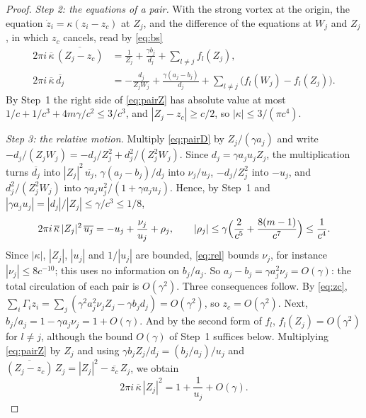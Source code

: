 \documentclass[11pt]{article}
\theoremstyle{definition}
\begin{document}
\begin{proof}
\emph{Step 2: the equations of a pair.} With the strong vortex at the origin, the equation $\dot z_i = \kappa(z_i - z_c)$ at $Z_j$, and the difference of the equations at $W_j$ and $Z_j$, in which $z_c$ cancels, read by \eqref{eq:bs}
\begin{align}
  2\pi i\,\overline{\kappa}\,\overline{(Z_j - z_c)} &= \frac{1}{Z_j} + \frac{\gamma b_j}{d_j} + \sum_{l \ne j} f_l(Z_j), \label{eq:pairZ}\\
  2\pi i\,\overline{\kappa}\,\overline{d_j} &= -\frac{d_j}{Z_jW_j} + \frac{\gamma(a_j - b_j)}{d_j} + \sum_{l \ne j} \bigl(f_l(W_j) - f_l(Z_j)\bigr). \label{eq:pairD}
\end{align}
By Step~1 the right side of \eqref{eq:pairZ} has absolute value at most $1/c + 1/c^3 + 4m\gamma/c^2 \le 3/c^3$, and $|Z_j - z_c| \ge c/2$, so $|\kappa| \le 3/(\pi c^4)$.

\emph{Step 3: the relative motion.} Multiply \eqref{eq:pairD} by $Z_j/(\gamma a_j)$ and write $-d_j/(Z_jW_j) = -d_j/Z_j^2 + d_j^2/(Z_j^2W_j)$. Since $d_j = \gamma a_j u_j Z_j$, the multiplication turns $\overline{d_j}$ into $|Z_j|^2\,\overline{u_j}$, $\gamma(a_j - b_j)/d_j$ into $\nu_j/u_j$, $-d_j/Z_j^2$ into $-u_j$, and $d_j^2/(Z_j^2W_j)$ into $\gamma a_j u_j^2/(1 + \gamma a_j u_j)$. Hence, by Step~1 and $|\gamma a_j u_j| = |d_j|/|Z_j| \le \gamma/c^3 \le 1/8$,
\begin{equation}\label{eq:rel}
  2\pi i\,\overline{\kappa}\,|Z_j|^2\,\overline{u_j} = -u_j + \frac{\nu_j}{u_j} + \rho_j, \qquad |\rho_j| \le \gamma\Bigl(\frac{2}{c^5} + \frac{8(m - 1)}{c^7}\Bigr) \le \frac{1}{c^4}.
\end{equation}
Since $|\kappa|$, $|Z_j|$, $|u_j|$ and $1/|u_j|$ are bounded, \eqref{eq:rel} bounds $\nu_j$, for instance $|\nu_j| \le 8c^{-10}$; this uses no information on $b_j/a_j$. So $a_j - b_j = \gamma a_j^2 \nu_j = O(\gamma)$: the total circulation of each pair is $O(\gamma^2)$. Three consequences follow. By \eqref{eq:zc}, $\sum_i \Gamma_i z_i = \sum_j (\gamma^2 a_j^2 \nu_j Z_j - \gamma b_j d_j) = O(\gamma^2)$, so $z_c = O(\gamma^2)$. Next, $b_j/a_j = 1 - \gamma a_j\nu_j = 1 + O(\gamma)$. And by the second form of $f_l$, $f_l(Z_j) = O(\gamma^2)$ for $l \ne j$, although the bound $O(\gamma)$ of Step~1 suffices below. Multiplying \eqref{eq:pairZ} by $Z_j$ and using $\gamma b_j Z_j/d_j = (b_j/a_j)/u_j$ and $\overline{(Z_j - z_c)}\,Z_j = |Z_j|^2 - \overline{z_c}\,Z_j$, we obtain
\begin{equation}\label{eq:rate}
  2\pi i\,\overline{\kappa}\,|Z_j|^2 = 1 + \frac{1}{u_j} + O(\gamma).
\end{equation}


\end{proof}
\end{document}
